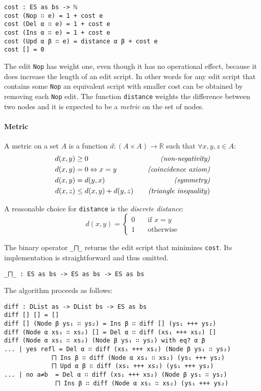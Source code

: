 \documentclass[../Thesis.tex]{subfiles}
\begin{document}
\begin{verbatim}
cost : ES as bs -> ℕ
cost (Nop ∷ e) = 1 + cost e
cost (Del α ∷ e) = 1 + cost e
cost (Ins α ∷ e) = 1 + cost e
cost (Upd α β ∷ e) = distance α β + cost e 
cost [] = 0
\end{verbatim}

	The edit \texttt{Nop} has weight one, even though it has
	no operational effect, because it does increase the length of 
	an edit script. In other words for any edit script that contains
	some \texttt{Nop} an equivalent script with smaller cost can be obtained
	by removing each \texttt{Nop} edit.	
	The function \texttt{distance} weights the difference between two nodes 
	and it is expected to be a \emph{metric} on the set of nodes.

	\paragraph{Metric}
	\label{par:Metric}
	A metric on a set $A$ is a function $d	 : (A \times A) \rightarrow \mathbb{R}$
	such that $\forall x, y, z \in A$:
	\begin{align*}
		d(x, y) &\geq 0 \quad &\mbox{\emph{{(non-negativity)}}}\\ 
		d(x, y) &= 0 \Leftrightarrow x = y \quad &\mbox{\emph{(coincidence axiom)}} \\		
		d(x, y) &= d(y, x) \quad &\mbox{\emph{(symmetry)}}\\
		d(x, z) &\leq d(x, y) + d(y, z) \quad &\mbox{\emph{(triangle inequality})}
	\end{align*}
	
	A reasonable choice for \texttt{distance} is the \emph{discrete distance}:
	\[ d(x, y) = 
		\begin{cases} 
			0 \quad &\mbox{if } x = y \\
			1 \quad &\mbox {otherwise}		
		\end{cases} \]
	
	The binary operator \texttt{\_⨅\_} returns the edit script that minimizes 	
	\texttt{cost}. Its implementation is straightforward and thus omitted.

\begin{verbatim}
_⨅_ : ES as bs -> ES as bs -> ES as bs
\end{verbatim}

	The algorithm proceeds as follows:

\begin{verbatim}
diff : DList as -> DList bs -> ES as bs
diff [] [] = []
diff [] (Node β ys₁ ∷ ys₂) = Ins β ∷ diff [] (ys₁ +++ ys₂)
diff (Node α xs₁ ∷ xs₂) [] = Del α ∷ diff (xs₁ +++ xs₂) []
diff (Node α xs₁ ∷ xs₂) (Node β ys₁ ∷ ys₂) with eq? α β
... | yes refl = Del α ∷ diff (xs₁ +++ xs₂) (Node β ys₁ ∷ ys₂) 
             ⨅ Ins β ∷ diff (Node α xs₁ ∷ xs₂) (ys₁ +++ ys₂) 
             ⨅ Upd α β ∷ diff (xs₁ +++ xs₂) (ys₁ +++ ys₂)
... | no a≠b  = Del α ∷ diff (xs₁ +++ xs₂) (Node β ys₁ ∷ ys₂) 
              ⨅ Ins β ∷ diff (Node α xs₁ ∷ xs₂) (ys₁ +++ ys₂)
\end{verbatim}
	
\end{document}
